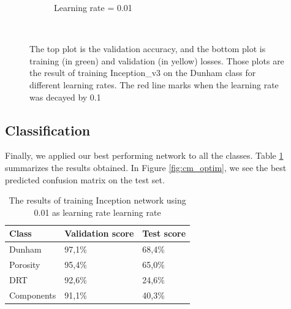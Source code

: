 \begin{figure}
{\begin{subfigure}[b]{.6\textwidth}
\caption{Learning rate = 0.01}
\label{fig:optim_001}
\end{subfigure}%
}\\
\caption[Training with different Learning rates]{The top plot is the validation accuracy, and the bottom plot is training (in green) and validation (in yellow) losses. Those plots are the result of training Inception\_v3 on the Dunham class for different learning rates. The red line marks when the learning rate was decayed by 0.1}
\label{fig:optim_plot}
\end{figure}


\subsection{Classification}

Finally, we applied our best performing network to all the classes. Table \ref{tab:optimall} summarizes the results obtained. In Figure \ref{fig:cm_optim}, we see the best predicted confusion matrix on the test set.  

\begin{table}
\caption[Scores of best performing Inception\_v3 with \gls{sgd}]{\label{tab:optimall} The results of training Inception network using 0.01 as learning rate learning rate}
\centering
\begin{tabular}[b]{| l | l | l |}
\hline
    Class & Validation score  & Test score\\ \hline
    Dunham  &  97,1\%  & 68,4\% \\ \hline
    Porosity & 95,4\% &  65,0\%\\ \hline
    DRT & 92,6\% &  24,6\% \\ \hline
    Components & 91,1\% &  40,3\% \\ \hline
\end{tabular} 
\end{table}

